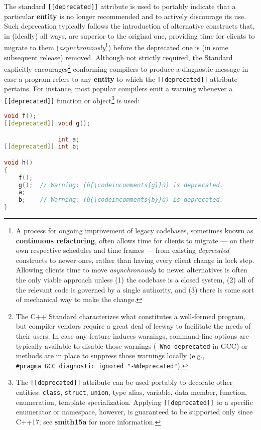 The standard \texttt{[[deprecated]]} attribute is used to portably
indicate that a particular \textbf{entity} is no longer recommended and
to actively discourage its use. Such deprecation typically follows the
introduction of alternative constructs that, in (ideally) all ways, are
superior to the original one, providing time for clients to migrate to
them (\emph{asynchronously}{\cprotect\footnote{A process for ongoing
improvement of legacy codebases, sometimes known as
\textbf{continuous refactoring}, often allows time for clients to
migrate --- on their own respective schedules and time frames --- from
existing \emph{deprecated} constructs to newer ones, rather than
having every client change in lock step. Allowing clients time to move
\emph{asynchronously} to newer alternatives is often the only viable
approach unless (1) the codebase is a closed system, (2) all of the
relevant code is governed by a single authority, and (3) there is some
  sort of mechanical way to make the change.}}) before the deprecated
one is (in some subsequent release) removed. Although not strictly
required, the Standard explicitly encourages{\cprotect\footnote{The C++
Standard characterizes what constitutes a well-formed program, but
compiler vendors require a great deal of leeway to facilitate the
needs of their users. In case any feature induces warnings,
command-line options are typically available to disable those warnings
(\texttt{-Wno-deprecated} in GCC) or methods are in place to suppress those warnings
locally (e.g.,
  \texttt{\#pragma}~\texttt{GCC}~\texttt{diagnostic}~\texttt{ignored}~\texttt{"-Wdeprecated"}).}}
conforming compilers to produce a diagnostic message in case a program
refers to any \textbf{entity} to which the \texttt{[[deprecated]]}
attribute pertains. For instance, most popular compilers emit a
warning whenever a \texttt{[[deprecated]]} function or
object{\cprotect\footnote{The \texttt{[[deprecated]]} attribute can be
used portably to decorate other entities: \texttt{class},
\texttt{struct}, \texttt{union}, type alias, variable, data member,
function, enumeration, template specialization. Applying
\texttt{[[deprecated]]} to a specific enumerator or namespace,
however, is guaranteed to be supported only since C++17; see
  \textbf{smith15a} for more information.}} is used:

\begin{lstlisting}[language=C++]
               void f();
[[deprecated]] void g();

               int a;
[[deprecated]] int b;

void h()
{
    f();
    g();  // Warning: (ù{\codeincomments{g}}ù) is deprecated.
    a;
    b;    // Warning: (ù{\codeincomments{b}}ù) is deprecated.
}
\end{lstlisting}

